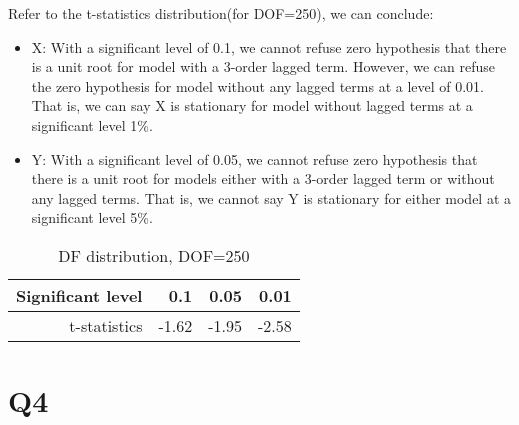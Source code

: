 \documentclass{article}
\begin{document}
Refer to the t-statistics distribution(for DOF=250), we can conclude:
\begin{itemize}
  \item X: With a significant level of 0.1, we cannot refuse zero hypothesis that there is a unit root for model with a 3-order lagged term. However, we can refuse the zero hypothesis for model without any lagged terms at a level of 0.01. That is, we can say X is stationary for model without lagged terms at a significant level 1\%.
  \item Y: With a significant level of 0.05, we cannot refuse zero hypothesis that there is a unit root for models either with a 3-order lagged term or without any lagged terms. That is, we cannot say Y is stationary for either model at a significant level 5\%.
\end{itemize}

\begin{table}
\centering
\begin{tabular}{rrrr}

Significant level  &          0.1 &          0.05  & 0.01\\
\hline
\hline
t-statistics &     -1.62 &        -1.95 &-2.58\\

\hline
\end{tabular}  
\caption{DF distribution, DOF=250}
\end{table}
\section{Q4}


% 
% 
% 
\end{document}
